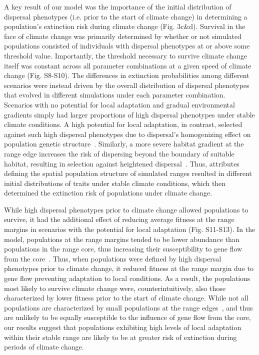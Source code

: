 \documentclass[12pt, oneside]{article}
\begin{document}
A key result of our model was the importance of the initial distribution of dispersal phenotypes (i.e. prior to the start of climate change) in determining a population's extinction risk during climate change (Fig. 3c\&d). Survival in the face of climate change was primarily determined by whether or not simulated populations consisted of individuals with dispersal phenotypes at or above some threshold value. Importantly, the threshold necessary to survive climate change itself was constant across all parameter combinations at a given speed of climate change (Fig. S8-S10). The differences in extinction probabilities among different scenarios were instead driven by the overall distribution of dispersal phenotypes that evolved in different simulations under each parameter combination. Scenarios with no potential for local adaptation and gradual environmental gradients simply had larger proportions of high dispersal phenotypes under stable climate conditions. A high potential for local adaptation, in contrast, selected against such high dispersal phenotypes due to dispersal's homogenizing effect on population genetic structure~\citep{lenormand2002gene}. Similarly, a more severe habitat gradient at the range edge increases the risk of dispersing beyond the boundary of suitable habitat, resulting in selection against heightened dispersal~\citep{shaw2014population}. Thus, attributes defining the spatial population structure of simulated ranges resulted in different initial distributions of traits under stable climate conditions, which then determined the extinction risk of populations under climate change.

While high dispersal phenotypes prior to climate change allowed populations to survive, it had the additional effect of reducing average fitness at the range margins in scenarios with the potential for local adaptation (Fig. S11-S13). In the model, populations at the range margins tended to be lower abundance than populations in the range core, thus increasing their susceptibility to gene flow from the core~\citep{lenormand2002gene}. Thus, when populations were defined by high dispersal phenotypes prior to climate change, it reduced fitness at the range margin due to gene flow preventing adaptation to local conditions. As a result, the populations most likely to survive climate change were, counterintuitively, also those characterized by lower fitness prior to the start of climate change. While not all populations are characterized by small populations at the range edges~\citep{dallas2017species}, and thus are unlikely to be equally susceptible to the influence of gene flow from the core, our results suggest that populations exhibiting high levels of local adaptation within their stable range are likely to be at greater risk of extinction during periods of climate change.
\end{document}
